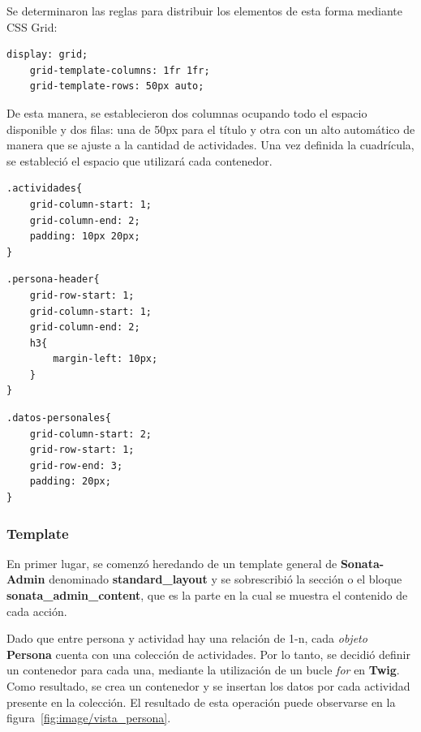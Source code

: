 Se determinaron las reglas para distribuir los elementos de esta forma mediante CSS Grid:

\begin{lstlisting}[caption={Definición de filas y columnas de la cuadrícula.\\Fuente: Elaboración propia.}]
    display: grid;
    grid-template-columns: 1fr 1fr;
    grid-template-rows: 50px auto;
\end{lstlisting}

De esta manera, se establecieron dos columnas ocupando todo el espacio disponible y dos filas: una de 50px para el título y otra con un alto automático de manera que se ajuste a la
cantidad de actividades\@.  Una vez definida la cuadrícula, se estableció el espacio que utilizará cada contenedor.


\begin{lstlisting}[caption={Orientación del contenedor de actividad en la cuadrícula.\\Fuente: Elaboración propia.}]
.actividades{
    grid-column-start: 1;
    grid-column-end: 2;
    padding: 10px 20px;
}
\end{lstlisting}


\begin{lstlisting}[caption={Orientación del contenedor del título de la accíon.\\Fuente: Elaboración propia.}]
.persona-header{
    grid-row-start: 1;
    grid-column-start: 1;
    grid-column-end: 2;
    h3{
        margin-left: 10px;
    }
}
\end{lstlisting}
\begin{lstlisting}[caption={Orientación del contenedor de datos personales.\\Fuente: Elaboración propia.}]
.datos-personales{
    grid-column-start: 2;
    grid-row-start: 1;
    grid-row-end: 3;
    padding: 20px;
}
\end{lstlisting}

\subsubsection{Template}%
\label{ssub:template}
En primer lugar, se comenzó heredando de un template general de \textbf{Sonata-Admin} denominado \textbf{standard\_layout} y se sobrescribió la sección o el bloque
\textbf{sonata\_admin\_content}, que es la parte en la cual se muestra el contenido de cada acción.



Dado que entre persona y actividad hay una relación de 1-n, cada \textit{objeto} \textbf{Persona} cuenta con una colección de actividades\@. Por lo tanto, se decidió definir
un contenedor para cada una, mediante la utilización de un bucle \textit{for} en \textbf{Twig}. Como resultado, se crea un contenedor y se insertan los datos por cada actividad
presente en la colección\@. El resultado de esta operación puede observarse en la figura~\ref{fig:image/vista_persona}\@.


